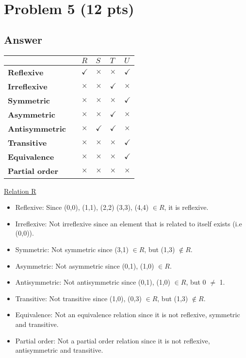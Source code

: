 \newpage

\section{Problem 5 (12 pts)}

\subsection{Answer}
\begin{center}
\begin{tabular}{|l|l|l|l|l|l|}
\hline
						&	&	$R$	&	$S$	&	$T$	& $U$\\
\hline
\textbf{Reflexive} 	    &   &$\checkmark$		&$\times$		&$\times$	&$\checkmark$	 \\
\hline
\textbf{Irreflexive} 	&   &$\times$		&$\times$		&$\checkmark$	&$\times$	 \\
\hline
\textbf{Symmetric} 	    &   &$\times$		&$\times$		&$\times$	&$\checkmark$	 \\
\hline
\textbf{Asymmetric} 	&   &$\times$		&$\times$		&$\checkmark$	&$\times$	 \\
\hline
\textbf{Antisymmetric}  &   &$\times$		&$\checkmark$		&$\checkmark$	&$\times$	 \\
\hline
\textbf{Transitive} 	&   &$\times$		&$\times$		&$\times$	&$\checkmark$	 \\
\hline
\textbf{Equivalence} 	&   &$\times$		&$\times$		&$\times$	&$\checkmark$	 \\
\hline
\textbf{Partial order} 	&   &$\times$		&$\times$		&$\times$	&$\times$	 \\
\hline
\end{tabular}
\end{center}

\underline{Relation R}
\begin{itemize}
    \item Reflexive:  Since (0,0), (1,1), (2,2) (3,3), (4,4) $\in R$, it is reflexive.
    \item Irreflexive: Not irreflexive since an element that is related to itself exists (i.e (0,0)).
    \item Symmetric: Not symmetric since (3,1) $\in R$, but (1,3) $\notin R$.
    \item Asymmetric: Not asymmetric since (0,1), (1,0) $\in R$.
    \item Antisymmetric: Not antisymmetric since (0,1), (1,0) $\in R$, but 0 $\neq$ 1.
    \item Transitive: Not transitive since (1,0), (0,3) $\in R$, but (1,3) $\notin R$. 
    \item Equivalence: Not an equivalence relation since it is not reflexive, symmetric and transitive.
    \item Partial order: Not a partial order relation since it is not reflexive, antisymmetric and transitive.
\end{itemize}


